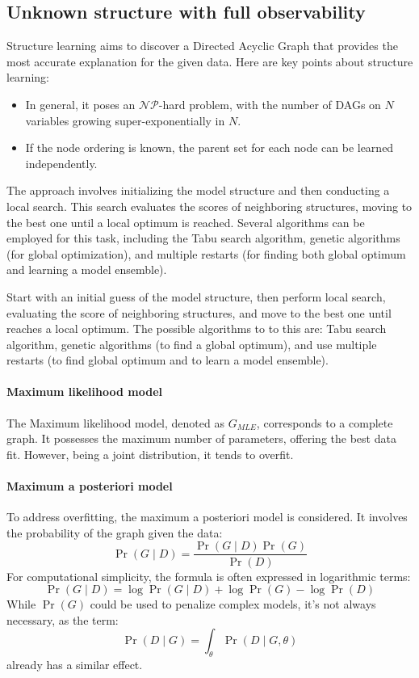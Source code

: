 \subsection{Unknown structure with full observability}
Structure learning aims to discover a Directed Acyclic Graph that provides the most accurate explanation for the given data. 
Here are key points about structure learning:
\begin{itemize}
    \item In general, it poses an $\mathcal{NP}$-hard problem, with the number of DAGs on $N$ variables growing super-exponentially in $N$.
    \item If the node ordering is known, the parent set for each node can be learned independently.
\end{itemize}
The approach involves initializing the model structure and then conducting a local search.
This search evaluates the scores of neighboring structures, moving to the best one until a local optimum is reached.
Several algorithms can be employed for this task, including the Tabu search algorithm, genetic algorithms (for global optimization), and multiple restarts (for finding both global optimum and learning a model ensemble).

Start with an initial guess of the model structure, then perform local search, evaluating the score of neighboring structures, and move to the best one until reaches a local optimum.
The possible algorithms to to this are: Tabu search algorithm, genetic algorithms (to find a global optimum), and use multiple restarts (to find global optimum and to learn a model ensemble). 

\paragraph*{Maximum likelihood model}
The Maximum likelihood model, denoted as $G_{MLE}$, corresponds to a complete graph. 
It possesses the maximum number of parameters, offering the best data fit. 
However, being a joint distribution, it tends to overfit.

\paragraph*{Maximum a posteriori model}
To address overfitting, the maximum a posteriori model is considered. 
It involves the probability of the graph given the data:
\[\Pr(G\mid D)=\dfrac{\Pr(G\mid D)\Pr(G)}{\Pr(D)}\]
For computational simplicity, the formula is often expressed in logarithmic terms:
\[\Pr(G\mid D)=\log\Pr(G\mid D)+\log\Pr(G)-\log\Pr(D)\]
While $\Pr(G)$ could be used to penalize complex models, it's not always necessary, as the term:
\[\Pr(D\mid G)=\int_{\theta} \Pr(D\mid G,\theta)\]
already has a similar effect.

